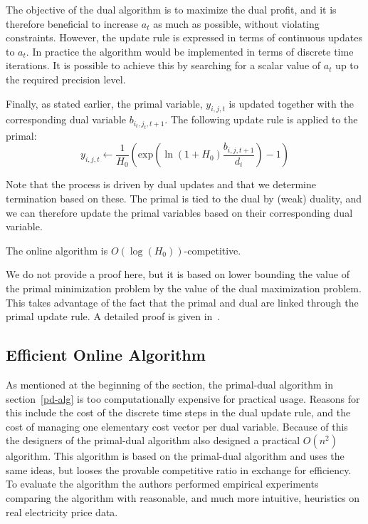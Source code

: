 The objective of the dual algorithm is to maximize the dual profit, and it is therefore beneficial to increase $a_t$ as much as possible, without violating constraints.
However, the update rule is expressed in terms of continuous updates to $a_t$.
In practice the algorithm would be implemented in terms of discrete time iterations.
It is possible to achieve this by searching for a scalar value of $a_t$ up to the required precision level.

Finally, as stated earlier, the primal variable, $y_{i,j,t}$ is updated together with the corresponding dual variable $b_{i_t,j_t,t+1}$.
The following update rule is applied to the primal:
\[
 y_{i,j,t} \leftarrow \frac{1}{H_0}\left(\textrm{exp}\left(\ln(1+H_0) \frac{b_{i,j,t+1}}{d_i}\right)-1\right)
\]

Note that the process is driven by dual updates and that we determine termination based on these.
The primal is tied to the dual by (weak) duality, and we can therefore update the primal variables based on their corresponding dual variable.

\begin{theorem}
 The online algorithm is $O(\log(H_0))$-competitive.
\end{theorem}

We do not provide a proof here, but it is based on lower bounding the value of the primal minimization problem by the value of the dual maximization problem. This takes advantage of the fact that the primal and dual are linked through the primal update rule.
A detailed proof is given in~\cite{buchbinder11:job-migration}.

\subsection{Efficient Online Algorithm}

As mentioned at the beginning of the section, the primal-dual algorithm in section~\ref{pd-alg} is too computationally expensive for practical usage.
Reasons for this include the cost of the discrete time steps in the dual update rule, and the cost of managing one \mbox{elementary} cost vector per dual variable.
Because of this the designers of the primal-dual algorithm also designed a practical $O(n^2)$ algorithm.
This algorithm is based on the primal-dual algorithm and uses the same ideas, but looses the provable competitive ratio in exchange for efficiency.
To evaluate the algorithm the authors performed empirical experiments comparing the algorithm with reasonable, and much more intuitive, heuristics on real electricity price data.

